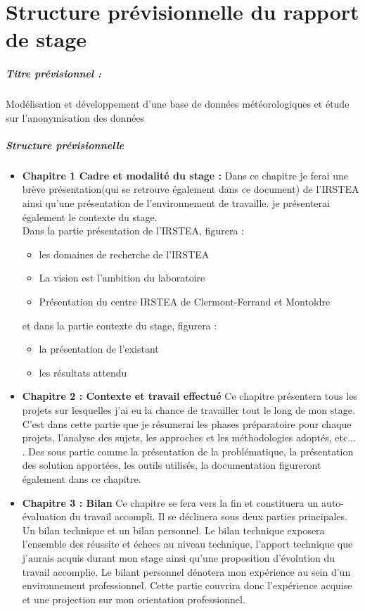 \chapter{Structure prévisionnelle du rapport de stage}
\paragraph{Titre prévisionnel : }
Modélisation et développement d'une base de données météorologiques et étude sur l'anonymisation des données

\paragraph{Structure prévisionnelle}
\begin{itemize}
    

\item {\textbf{Chapitre 1  Cadre et modalité du stage : }}
Dans ce chapitre je ferai une brève présentation(qui se retrouve également dans ce document) de l'IRSTEA ainsi qu'une présentation de l'environnement de travaille. je présenterai également le contexte du stage.
\\
Dans la partie présentation de l'IRSTEA, figurera  : 
\begin{itemize}
 \item les domaines de recherche de l'IRSTEA
 \item La vision est l'ambition du laboratoire
 \item Présentation du centre IRSTEA de Clermont-Ferrand et Montoldre
 \end{itemize}
et dans la partie contexte du stage, figurera : 
\begin{itemize}
    \item la présentation de l'existant
    \item les résultats attendu
\end{itemize}

\item {\textbf{Chapitre 2 : Contexte et travail effectué}}
Ce chapitre présentera tous les projets sur lesquelles j'ai eu la chance de travailler tout le long de mon stage.
C'est  dans cette partie que je résumerai les phases préparatoire pour chaque projets, l'analyse des sujets, les approches et les méthodologies adoptés, etc... . Des sous partie comme la présentation de la problématique, la présentation des solution apportées, les outils utilisés, la documentation figureront également dans ce chapitre.

\item {\textbf{Chapitre 3 : Bilan}}
Ce chapitre se fera vers la fin et constituera un auto-évaluation du travail accompli. Il se déclinera sous deux parties principales. Un bilan technique et un bilan personnel. Le bilan technique exposera l'ensemble des réussite et échecs au niveau technique, l'apport technique que j'aurais acquis durant mon stage ainsi qu'une proposition d'évolution du travail accomplie. Le bilant personnel dénotera mon expérience au sein d'un environnement professionnel. Cette partie couvrira donc  l'expérience acquise et une projection sur mon orientation professionnel.
\end{itemize}






